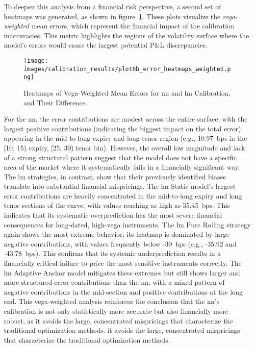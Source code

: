 To deepen this analysis from a financial risk perspective, a second set of heatmaps was generated, as shown in figure~\ref{fig:error_heatmaps_weighted}. These plots visualize the \textit{vega-weighted} mean errors, which represent the financial impact of the calibration inaccuracies. This metric highlights the regions of the volatility surface where the model's errors would cause the largest potential P\&L discrepancies.

\begin{figure}[H]
	\centering
	\texttt{[image: images/calibration\_results/plot6b\_error\_heatmaps\_weighted.png]}
	\caption{Heatmaps of Vega-Weighted Mean Errors for \ac{nn} and \ac{lm} Calibration, and Their Difference.}
	\label{fig:error_heatmaps_weighted}
\end{figure}

For the \ac{nn}, the error contributions are modest across the entire surface, with the largest positive contributions (indicating the biggest impact on the total error) appearing in the mid-to-long expiry and long tenor region (e.g., 10.97~\ac{bps} in the [10, 15) expiry, [25, 30) tenor bin). However, the overall low magnitude and lack of a strong structural pattern suggest that the model does not have a specific area of the market where it systematically fails in a financially significant way. The \ac{lm} strategies, in contrast, show that their previously identified biases translate into substantial financial mispricings. The \ac{lm} Static model's largest error contributions are heavily concentrated in the mid-to-long expiry and long tenor sections of the curve, with values reaching as high as 35.45~\ac{bps}. This indicates that its systematic overprediction has the most severe financial consequences for long-dated, high-vega instruments. The \ac{lm} Pure Rolling strategy again shows the most extreme behavior; its heatmap is dominated by large negative contributions, with values frequently below -30~\ac{bps} (e.g., -35.92 and -43.78~\ac{bps}). This confirms that its systemic underprediction results in a financially critical failure to price the most sensitive instruments correctly. The \ac{lm} Adaptive Anchor model mitigates these extremes but still shows larger and more structured error contributions than the \ac{nn}, with a mixed pattern of negative contributions in the mid-section and positive contributions at the long end. This vega-weighted analysis reinforces the conclusion that the \ac{nn}'s calibration is not only statistically more accurate but also financially more robust, as it avoids the large, concentrated mispricings that characterize the traditional optimization methods. it avoids the large, concentrated mispricings that characterize the traditional optimization methods.

